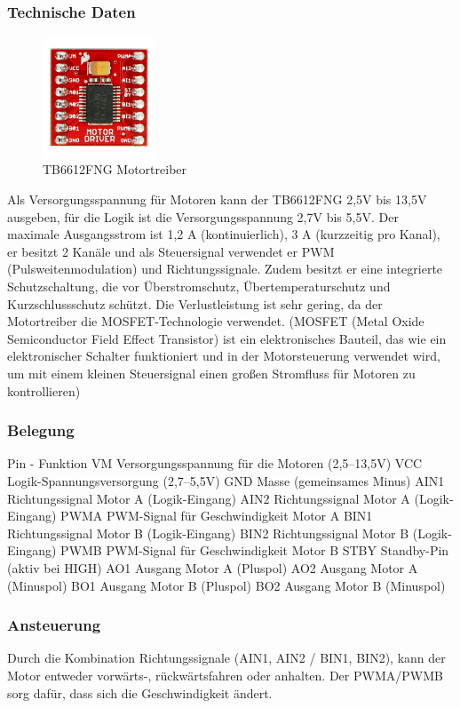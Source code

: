 \subsubsection{Technische Daten}
\begin{figure}[H]
    \centering
    \includegraphics[width=0.3\textwidth]{img/Hardware/Motortreiber.png}
    \caption{TB6612FNG Motortreiber}
    \label{fig:motortreiber}
\end{figure}
Als Versorgungsspannung für Motoren kann der TB6612FNG 2,5V bis 13,5V ausgeben,
für die Logik ist die Versorgungsspannung 2,7V bis 5,5V.
%
Der maximale Ausgangsstrom ist 1,2 A (kontinuierlich), 3 A (kurzzeitig pro Kanal),
er besitzt 2 Kanäle und als Steuersignal verwendet er PWM (Pulsweitenmodulation) und Richtungssignale.
%
Zudem besitzt er eine integrierte Schutzschaltung,
die vor Überstromschutz, Übertemperaturschutz und Kurzschlussschutz schützt. 
%
Die Verlustleistung ist sehr gering,
da der Motortreiber die MOSFET-Technologie verwendet.
%
(MOSFET (Metal Oxide Semiconductor Field Effect Transistor) ist ein elektronisches Bauteil, 
das wie ein elektronischer Schalter funktioniert und in der Motorsteuerung verwendet wird,
um mit einem kleinen Steuersignal einen großen Stromfluss für Motoren zu kontrollieren)
\subsubsection{Belegung}
Pin	-	Funktion
VM	Versorgungsspannung für die Motoren (2,5–13,5V)
VCC	Logik-Spannungsversorgung (2,7–5,5V)
GND	Masse (gemeinsames Minus)
AIN1	Richtungssignal Motor A (Logik-Eingang)
AIN2	Richtungssignal Motor A (Logik-Eingang)
PWMA	PWM-Signal für Geschwindigkeit Motor A
BIN1	Richtungssignal Motor B (Logik-Eingang)
BIN2	Richtungssignal Motor B (Logik-Eingang)
PWMB	PWM-Signal für Geschwindigkeit Motor B
STBY	Standby-Pin (aktiv bei HIGH)
AO1	Ausgang Motor A (Pluspol)
AO2	Ausgang Motor A (Minuspol)
BO1	Ausgang Motor B (Pluspol)
BO2	Ausgang Motor B (Minuspol)

\subsubsection{Ansteuerung}
Durch die Kombination Richtungssignale (AIN1, AIN2 / BIN1, BIN2),
kann der Motor entweder vorwärts-, rückwärtsfahren oder anhalten.
%
Der PWMA/PWMB sorg dafür, dass sich die Geschwindigkeit ändert.
%
